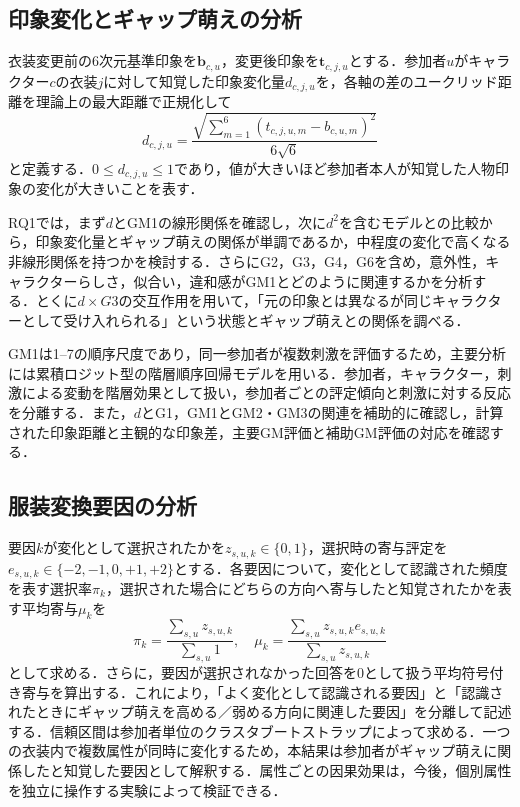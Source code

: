 \documentclass[a4j,twocolumn,11pt]{jarticle}
\begin{document}
\subsection{印象変化とギャップ萌えの分析}
衣装変更前の6次元基準印象を$\mathbf{b}_{c,u}$，変更後印象を$\mathbf{t}_{c,j,u}$とする．参加者$u$がキャラクター$c$の衣装$j$に対して知覚した印象変化量$d_{c,j,u}$を，各軸の差のユークリッド距離を理論上の最大距離で正規化して
\begin{equation}
 d_{c,j,u}=\frac{\sqrt{\sum_{m=1}^{6}(t_{c,j,u,m}-b_{c,u,m})^2}}{6\sqrt{6}}
\end{equation}
と定義する．$0\le d_{c,j,u}\le1$であり，値が大きいほど参加者本人が知覚した人物印象の変化が大きいことを表す．

RQ1では，まず$d$とGM1の線形関係を確認し，次に$d^2$を含むモデルとの比較から，印象変化量とギャップ萌えの関係が単調であるか，中程度の変化で高くなる非線形関係を持つかを検討する．さらにG2，G3，G4，G6を含め，意外性，キャラクターらしさ，似合い，違和感がGM1とどのように関連するかを分析する．とくに$d\times G3$の交互作用を用いて，「元の印象とは異なるが同じキャラクターとして受け入れられる」という状態とギャップ萌えとの関係を調べる．

GM1は1--7の順序尺度であり，同一参加者が複数刺激を評価するため，主要分析には累積ロジット型の階層順序回帰モデルを用いる．参加者，キャラクター，刺激による変動を階層効果として扱い，参加者ごとの評定傾向と刺激に対する反応を分離する．また，$d$とG1，GM1とGM2・GM3の関連を補助的に確認し，計算された印象距離と主観的な印象差，主要GM評価と補助GM評価の対応を確認する．

\subsection{服装変換要因の分析}
要因$k$が変化として選択されたかを$z_{s,u,k}\in\{0,1\}$，選択時の寄与評定を$e_{s,u,k}\in\{-2,-1,0,+1,+2\}$とする．各要因について，変化として認識された頻度を表す選択率$\pi_k$，選択された場合にどちらの方向へ寄与したと知覚されたかを表す平均寄与$\mu_k$を
\begin{equation}
 \pi_k=\frac{\sum_{s,u}z_{s,u,k}}{\sum_{s,u}1},\quad
 \mu_k=\frac{\sum_{s,u}z_{s,u,k}e_{s,u,k}}{\sum_{s,u}z_{s,u,k}}
\end{equation}
として求める．さらに，要因が選択されなかった回答を0として扱う平均符号付き寄与を算出する．これにより，「よく変化として認識される要因」と「認識されたときにギャップ萌えを高める／弱める方向に関連した要因」を分離して記述する．信頼区間は参加者単位のクラスタブートストラップによって求める．一つの衣装内で複数属性が同時に変化するため，本結果は参加者がギャップ萌えに関係したと知覚した要因として解釈する．属性ごとの因果効果は，今後，個別属性を独立に操作する実験によって検証できる．
\end{document}
